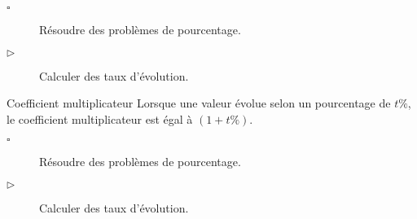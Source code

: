 \documentclass[openany]{book}
\begin{document}





\begin{seance}[Proportionnalité]

\begin{description}
\item[$\square$] Résoudre des problèmes de pourcentage.
\item[$\triangleright$] Calculer des taux d'évolution.
\end{description}
\end{seance}


\begin{DefT}{Coefficient multiplicateur}
Lorsque une valeur évolue selon un pourcentage de $t \%$, le coefficient multiplicateur est égal à $(1+t\%)$.
\end{DefT}

%


\begin{minipage}{0.47\linewidth}
\Exe




\Exe



\Exe



\end{minipage}
\hfill
\begin{minipage}{0.47\linewidth}

\Exe



\Exe



\Exe


\end{minipage}

\begin{seance}[Proportionnalité]

\begin{description}
\item[$\square$] Résoudre des problèmes de pourcentage.
\item[$\triangleright$] Calculer des taux d'évolution.
\end{description}
\end{seance}

\Exe



\Dnb


\end{document}
